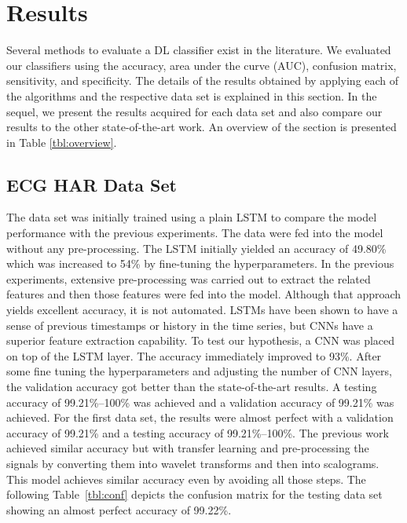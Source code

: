 \documentclass{ieeeaccess}
\begin{document}
\section{Results}
Several methods to evaluate a DL classifier exist in the literature. We evaluated our classifiers using the accuracy, area under the curve (AUC), confusion matrix, sensitivity, and specificity. The details of the results obtained by applying each of the algorithms and the respective data set is explained in this section. 
In the sequel, we present the results acquired for each data set and also compare our results to the other state-of-the-art work. An overview of the section is presented in Table \ref{tbl:overview}.

\subsection{ECG HAR Data Set}\label{sec:ecgHarDataSet}
The data set was initially trained using a plain LSTM to compare the model performance with the previous experiments. The data were fed into the model without any pre-processing. The LSTM initially yielded an accuracy of 49.80\% which was increased to 54\% by fine-tuning the hyperparameters. In the previous experiments, extensive pre-processing was carried out to extract the related features and then those features were fed into the model. Although that approach yields excellent accuracy, it is not automated. LSTMs have been shown to have a sense of previous timestamps or history in the time series, but CNNs have a superior feature extraction capability. To test our hypothesis, a CNN was placed on top of the LSTM layer. The accuracy immediately improved to 93\%. After some fine tuning the hyperparameters and adjusting the number of CNN layers, the validation accuracy got better than the state-of-the-art results. A testing accuracy of 99.21\%--100\% was achieved and a validation accuracy of 99.21\% was achieved.
For the first data set, the results were almost perfect with a validation accuracy of 99.21\% and a testing accuracy of 99.21\%--100\%. The previous work achieved similar accuracy but with transfer learning and pre-processing the signals by converting them into wavelet transforms and then into scalograms. This model achieves similar accuracy even by avoiding all those steps.
The following Table~\ref{tbl:conf} depicts the confusion matrix for the testing data set showing an almost perfect accuracy of 99.22\%.
\end{document}
